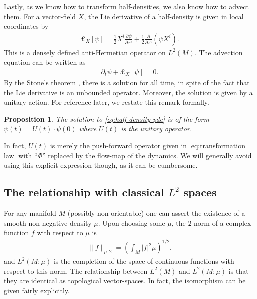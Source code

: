 \documentclass[final,leqno]{siamltex1213}
\newcommand{\pder}[2]{\ensuremath{\frac{ \partial #1}{\partial #2}}}
\newtheorem{prop}[thm]{Proposition}
\begin{document}
Lastly, as we know how to transform half-densities, we also know how to advect them.
For a vector-field $X$, the Lie derivative of a half-density is given in local coordinates by
\begin{align}
	\pounds_{X}[\psi] = \frac{1}{2} X^{i} \pder{\psi}{x^{i}} + \frac{1}{2} \pder{}{x^{i}} \left( \psi X^{i} \right). \label{eq:representation}
\end{align}
This is a densely defined anti-Hermetian operator on $L^{2}(M)$.
The advection equation can be written as
\begin{align}
	\partial_{t} \psi + \pounds_{X}[\psi] = 0.
\end{align}
By the Stone's theorem \cite{Conway1990}, there is a solution for all time, in spite of the fact that the Lie derivative is an unbounded operator.
Moreover, the solution is given by a unitary action.  For reference later, we restate this remark formally.
\begin{prop} \label{prop:stone}
	The solution to \eqref{eq:half density pde} is of the form $\psi(t) = U(t) \cdot \psi(0)$ where $U(t)$ is
	the unitary operator.
\end{prop}

In fact, $U(t)$ is merely the push-forward operator given in \eqref{eq:transformation law} with ``$\Phi$'' replaced by the flow-map of the dynamics.
We will generally avoid using this explicit expression though, as it can be cumbersome.


\subsection{The relationship with classical $L^{2}$ spaces}
\label{sec:classical_Lebesgue}
For any manifold $M$ (possibly non-orientable) one can assert the existence of a smooth non-negative density $\mu$.
Upon choosing some $\mu$, the $2$-norm of a complex function $f$ with respect to $\mu$ is
\begin{align}
	\| f \|_{\mu,2} =  \left( \int_M |f|^2 \mu \right)^{1/2}.
\end{align}
and $L^2(M ; \mu)$ is the completion of the space of continuous functions with respect to this norm.
The relationship between $L^{2}(M)$ and $L^{2}(M;\mu)$ is that they are identical as topological vector-spaces.
In fact, the isomorphism can be given fairly explicitly.
\end{document}
